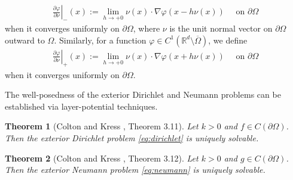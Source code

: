 \documentclass{article}
\theoremstyle{plain}
\newtheorem{thm}{Theorem}[section]
\theoremstyle{definition}
\begin{document}
\begin{align}
    \left. \frac{\partial \varphi}{\partial \nu}\right|_-(x) := \lim_{h\to +0} \nu(x)\cdot \nabla \varphi(x - h\nu(x)) \quad\text{ on }\partial\Omega
\end{align}
when it converges uniformly on $\partial\Omega$, where $\nu$ is the unit normal vector on $\partial\Omega$ outward to $\Omega$. Similarly, for a function $\varphi\in C^1(\mathbb R^d\setminus\overline\Omega)$, we define
\begin{align}
    \left. \frac{\partial \varphi}{\partial \nu}\right|_+(x) := \lim_{h\to +0} \nu(x)\cdot \nabla \varphi(x + h\nu(x)) \quad\text{ on }\partial\Omega
\end{align}
when it converges uniformly on $\partial\Omega$.

The well-posedness of the exterior Dirichlet and Neumann problems can be established via layer-potential techniques. 
\begin{thm}[Colton and Kress \cite{colton1998inverse}, Theorem 3.11]\label{thm:wellposed-dirichlet}
    Let $k>0$ and $f\in C(\partial\Omega)$. Then the exterior Dirichlet problem \cref{eq:dirichlet} is uniquely solvable.
\end{thm}

\begin{thm}[Colton and Kress \cite{colton1998inverse}, Theorem 3.12]\label{thm:wellposed-neumann}
    Let $k>0$ and $g\in C(\partial\Omega)$. Then the exterior Neumann problem \cref{eq:neumann} is uniquely solvable.
\end{thm}
\end{document}
